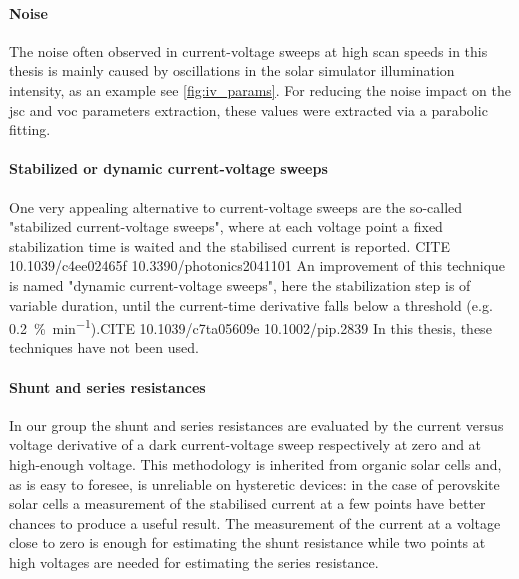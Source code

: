 	\paragraph{Noise} The noise often observed in current-voltage sweeps at high scan speeds in this thesis is mainly caused by oscillations in the solar simulator illumination intensity, as an example see \cref{fig:iv_params}. For reducing the noise impact on the \gls{jsc} and \gls{voc} parameters extraction, these values were extracted via a parabolic fitting. %

	\paragraph{Stabilized or dynamic current-voltage sweeps} One very appealing alternative to current-voltage sweeps are the so-called "stabilized current-voltage sweeps", where at each voltage point a fixed stabilization time is waited and the stabilised current is reported. CITE 10.1039/c4ee02465f 10.3390/photonics2041101
	An improvement of this technique is named "dynamic current-voltage sweeps", here the stabilization step is of variable duration, until the current-time derivative falls below a threshold (e.g. \SI{0.2}{\%\per\minute}).CITE 10.1039/c7ta05609e 10.1002/pip.2839
	In this thesis, these techniques have not been used.

	\paragraph{Shunt and series resistances} \label{resistances} In our group the shunt and series resistances are evaluated by the current versus voltage derivative of a dark current-voltage sweep respectively at zero and at high-enough voltage. This methodology is inherited from organic solar cells and, as is easy to foresee, is unreliable on hysteretic devices: in the case of perovskite solar cells a measurement of the stabilised current at a few points have better chances to produce a useful result. The measurement of the current at a voltage close to zero is enough for estimating the shunt resistance while two points at high voltages are needed for estimating the series resistance.

